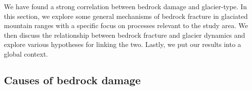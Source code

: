 \documentclass[review]{igs}
\begin{document}

We have found a strong correlation between bedrock damage and glacier-type. In this section, we explore some general mechanisms of bedrock fracture in glaciated mountain ranges with a specific focus on processes relevant to the study area. We then discuss the relationship between bedrock fracture and glacier dynamics and explore various hypotheses for linking the two. Lastly, we put our results into a global context. 

\subsection{Causes of bedrock damage}
\end{document}
